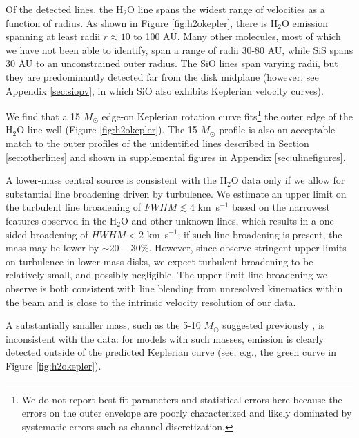 \documentclass[twocolumn]{aastex61}
\newcommand{\msun}{\ensuremath{M_{\odot}}\xspace}			%
\newcommand{\water}{H$_{2}$O\xspace}		%
\newcommand{\kms}{\textrm{km~s}\ensuremath{^{-1}}\xspace}	%
\begin{document}
Of the detected lines, the \water line spans the widest range of
velocities as a function of radius.  As shown in Figure \ref{fig:h2okepler},
there is \water emission spanning at least radii $r\approx 10$ to 100 AU.  Many
other molecules, most of
which we have not been able to identify, span a range of radii 30-80 AU, while SiS
spans 30 AU to an unconstrained outer radius.   The SiO lines span varying radii,
but they are predominantly detected far from the disk midplane (however,
see Appendix \ref{sec:siopv}, in which SiO also exhibits Keplerian velocity
curves).

We find that a 15 \msun edge-on Keplerian rotation curve fits\footnote{We do
not report best-fit parameters and statistical errors here because the errors
on the outer envelope are poorly characterized and likely dominated by
systematic errors such as channel discretization.} the outer edge of
the \water line well (Figure \ref{fig:h2okepler}).  The 15 \msun profile is
also an acceptable match to the outer profiles of the unidentified lines
described in Section \ref{sec:otherlines} and shown in supplemental figures in
Appendix \ref{sec:ulinefigures}.

A lower-mass central source is consistent with the \water data only if we allow
for substantial line broadening driven by turbulence.  We estimate an upper
limit on the turbulent line broadening of $FWHM\lesssim4$ \kms based on the
narrowest features observed in the \water and other unknown lines, which
results in a one-sided broadening of $HWHM<2$ \kms; if such line-broadening is
present, the mass may be lower by $\sim20-30\%$.
However, since \citet{Flaherty2017a} observe stringent upper limits on
turbulence in lower-mass disks, we expect turbulent broadening to be relatively
small, and possibly negligible.  The upper-limit line broadening we observe is
both consistent with line blending from unresolved kinematics within the beam
and is close to the intrinsic velocity resolution of our data.


A substantially smaller mass, such as the 5-10 \msun suggested previously
\citep{Plambeck2016a,Hirota2014a}, is inconsistent with the data: for models
with such masses, emission is clearly detected outside of the predicted
Keplerian curve (see, e.g., the green curve in Figure \ref{fig:h2okepler}).  
\end{document}
